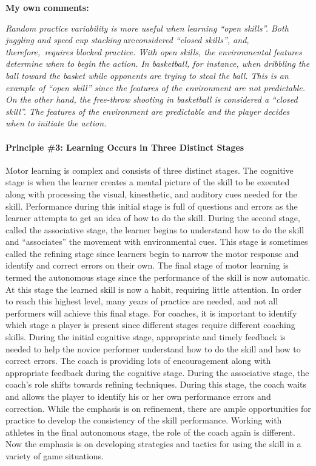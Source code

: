\documentclass[
  letterpaper,
  DIV=11,
  numbers=noendperiod]{scrartcl}
\let\oldparagraph\paragraph
\renewcommand{\paragraph}[1]{\oldparagraph{#1}\mbox{}}
\begin{document}
\textbf{My own comments:}

\emph{Random practice variability is more useful when learning ``open
skills''. Both juggling and speed cup stacking} are\emph{considered
``closed skills'', and, therefore,~requires blocked practice. With open
skills, the environmental features determine when to begin the action.
In basketball, for instance, when dribbling the ball toward the basket
while opponents are trying to steal the ball. This is an example of
``open skill'' since the features of the environment are not
predictable. On the other hand, the free-throw shooting in basketball is
considered a ``closed skill''. The features of the environment are
predictable and the player decides when to initiate the action.}

\hypertarget{principle-3-learning-occurs-in-three-distinct-stages}{%
\paragraph{\texorpdfstring{\textbf{Principle \#3: Learning Occurs in
Three Distinct
Stages}}{Principle \#3: Learning Occurs in Three Distinct Stages}}\label{principle-3-learning-occurs-in-three-distinct-stages}}

Motor learning is complex and consists of three distinct stages. The
cognitive stage is when the learner creates a mental picture of the
skill to be executed along with processing the visual, kinesthetic, and
auditory cues needed for the skill. Performance during this initial
stage is full of questions and errors as the learner attempts to get an
idea of how to do the skill. During the second stage, called the
associative stage, the learner begins to understand how to do the skill
and ``associates'' the movement with environmental cues. This stage is
sometimes called the refining stage since learners begin to narrow the
motor response and identify and correct errors on their own. The final
stage of motor learning is termed the autonomous stage since the
performance of the skill is now automatic. At this stage the learned
skill is now a habit, requiring little attention. In order to reach this
highest level, many years of practice are needed, and not all performers
will achieve this final stage. For coaches, it is important to identify
which stage a player is present since different stages require different
coaching skills. During the initial cognitive stage, appropriate and
timely feedback is needed to help the novice performer understand how to
do the skill and how to correct errors. The coach is providing lots of
encouragement along with appropriate feedback during the cognitive
stage. During the associative stage, the coach's role shifts towards
refining techniques. During this stage, the coach waits and allows the
player to identify his or her own performance errors and correction.
While the emphasis is on refinement, there are ample opportunities for
practice to develop the consistency of the skill performance. Working
with athletes in the final autonomous stage, the role of the coach again
is different. Now the emphasis is on developing strategies and tactics
for using the skill in a variety of game situations.
\end{document}
